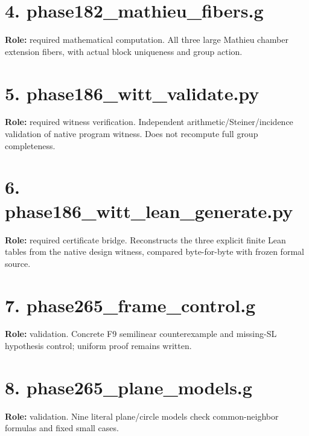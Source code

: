 \documentclass[
  11pt,
  a4paper,
]{article}
\begin{document}
\section{4. phase182\_mathieu\_fibers.g}
\textbf{Role:} required mathematical computation. All three large Mathieu chamber extension fibers, with actual block uniqueness and group action.

\section{5. phase186\_witt\_validate.py}
\textbf{Role:} required witness verification. Independent arithmetic/Steiner/incidence validation of native program witness. Does not recompute full group completeness.

\section{6. phase186\_witt\_lean\_generate.py}
\textbf{Role:} required certificate bridge. Reconstructs the three explicit finite Lean tables from the native design witness, compared byte-for-byte with frozen formal source.

\section{7. phase265\_frame\_control.g}
\textbf{Role:} validation. Concrete F9 semilinear counterexample and missing-SL hypothesis control; uniform proof remains written.

\section{8. phase265\_plane\_models.g}
\textbf{Role:} validation. Nine literal plane/circle models check common-neighbor formulas and fixed small cases.
\end{document}
